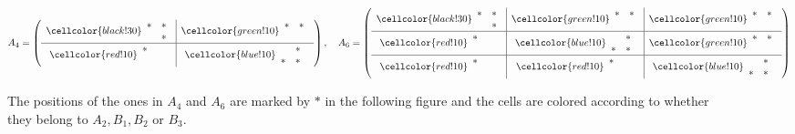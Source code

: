 \documentclass[10pt,a4paper]{article}
\numberwithin{equation}{section}
\begin{document}
\begin{figure}
$$ A_4 = \left(\begin{array}{c|c}
\cellcolor{black!30}\begin{array}{cc} * & * \\  & * \end{array}&\cellcolor{green!10} \begin{array}{cc} * & * \\  &  \end{array}\\
\hline
\cellcolor{red!10}\begin{array}{cc} * & \;\text{ }  \\  &  \end{array}& \cellcolor{blue!10}\begin{array}{cc}  & * \\ * & * \end{array}
 \end{array}\right),
 \quad 
 A_6 = \left(\begin{array}{c|c|c} 
 \cellcolor{black!30} \begin{array}{cc} * & * \\ & * \end{array}& \cellcolor{green!10}\begin{array}{cc} * & * \\  &  \end{array} & \cellcolor{green!10} \begin{array}{cc} * & * \\  &  \end{array} \\
 \hline
\cellcolor{red!10}\begin{array}{cc} * & \;\text{ }  \\  &  \end{array} & \cellcolor{blue!10}  \begin{array}{cc}  & * \\ * & * \end{array} &  \cellcolor{green!10}\begin{array}{cc} * & * \\  &  \end{array}  \\
\hline
\cellcolor{red!10}\begin{array}{cc} * & \;\text{ } \\  &  \end{array}& \cellcolor{red!10}\begin{array}{cc} * & \;\text{ } \\  &  \end{array} &  \cellcolor{blue!10}\begin{array}{cc}  & * \\ * & * \end{array} \\
\end{array}\right)
  $$
\caption{The positions of the ones in $A_4$ and $A_6$ are marked by $*$ in the following figure and the cells are colored according to whether they belong to $A_2, B_1, B_2$ or $B_3$.}\label{fig:qubit-matrices}
\end{figure}
\end{document}
